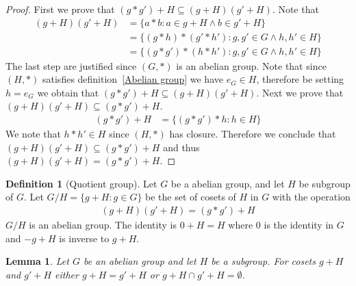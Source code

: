\documentclass{article}
\theoremstyle{plain}
\newtheorem{lemma}[theorem]{Lemma}
\theoremstyle{definition}
\newtheorem{definition}[theorem]{Definition}
\begin{document}
\begin{proof}
	First we prove that $(g*g')+H\subseteq (g+H)(g'+H)$. Note that
	\begin{equation}
	\begin{aligned}
		(g+H)(g'+H) &= \{a*b:a\in g+H\land b\in g'+H\}\\
					&= \{(g*h)*(g'*h'):g,g'\in G\land h,h'\in H\}\\
					&= \{(g*g')*(h*h'):g,g'\in G\land h,h'\in H\}
	\end{aligned}
	\end{equation}
	The last step are justified since $(G,*)$ is an abelian group. Note that
	since $(H,*)$ satisfies definition~\ref{Abelian group} we have $e_G\in H$,
	therefore be setting $h=e_G$ we obtain that $(g*g')+H\subseteq (g+H)(g'+H)$.
	Next we prove that $(g+H)(g'+H)\subseteq (g*g')+H$. 
	\begin{equation}
	\begin{aligned}
		(g*g')+H &= \{(g*g')*h:h\in H\}
	\end{aligned}
	\end{equation}
	We note that $h*h'\in H$ since $(H,*)$ has closure. Therefore we conclude
	that $(g+H)(g'+H)\subseteq (g*g')+H$ and thus $(g+H)(g'+H)=(g*g')+H$.
\end{proof}
\begin{definition}[Quotient group]\label{quotient group}
	Let $G$ be a abelian group, and let $H$ be subgroup of $G$. Let
	$G/H = \{g+H:g\in G\}$ be the set of cosets of $H$ in $G$ with
	the operation
	\begin{equation}
	\begin{aligned}
		(g+H)(g'+H)=(g*g')+H
	\end{aligned}
	\end{equation}
	$G/H$ is an abelian group. The identity is $0+H=H$ where $0$ is the identity
	in $G$ and $-g+H$ is inverse to $g+H$.
\end{definition}
\begin{lemma}
	Let $G$ be an abelian group and let $H$ be a subgroup. For cosets $g+H$ and
	$g'+H$ either $g+H=g'+H$ or $g+H\cap g'+H=\emptyset$.
\end{lemma}
\end{document}
